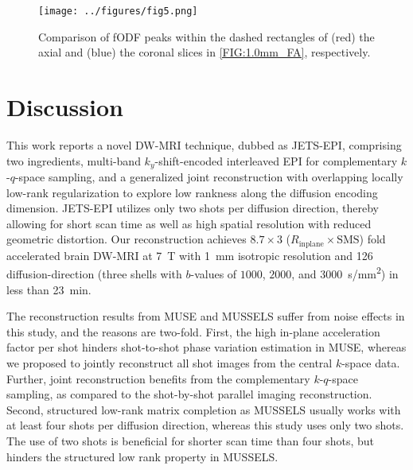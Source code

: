 \documentclass[preprint,12pt,authoryear,review]{elsarticle}
\begin{document}
	\begin{figure}
		\centering
		\texttt{[image: ../figures/fig5.png]}
		\caption{Comparison of fODF peaks within the dashed rectangles
		of (red) the axial and (blue) the coronal slices in \cref{FIG:1.0mm_FA}, respectively.}
		\label{FIG:1.0mm_fODF}
	\end{figure}

	\clearpage

	\section{Discussion}
	\label{SEC:Disc}

	This work reports a novel DW-MRI technique, dubbed as JETS-EPI,
	comprising two ingredients,
	multi-band $k_y$-shift-encoded interleaved EPI
	for complementary $k$-$q$-space sampling, and
	a generalized joint reconstruction
	with overlapping locally low-rank regularization
	to explore low rankness along the diffusion encoding dimension.
	JETS-EPI utilizes only two shots per diffusion direction,
        thereby allowing for short scan time %
        as well as high spatial resolution with reduced geometric distortion.
	Our reconstruction achieves $8.7 \times 3$ ($R_\mathrm{inplane} \times \mathrm{SMS}$)
	fold accelerated brain DW-MRI at \SI{7}{\tesla}
	with \SI{1}{mm} isotropic resolution
	and 126 diffusion-direction (three shells with
	$b$-values of $1000$, $2000$, and \SI{3000}{s/mm^2})
	in less than \SI{23}{min}.

	The reconstruction results from MUSE and MUSSELS
	suffer from noise effects in this study,
	and the reasons are two-fold.
	First, the high in-plane acceleration factor per shot
	hinders shot-to-shot phase variation estimation in MUSE,
        whereas we proposed to jointly reconstruct all shot images from the central $k$-space data.
        Further, joint reconstruction benefits from the complementary $k$-$q$-space sampling,
        as compared to the shot-by-shot parallel imaging reconstruction.
	Second, structured low-rank matrix completion as MUSSELS usually
	works with at least four shots per diffusion direction,
	whereas this study uses only two shots.
        The use of two shots is beneficial for shorter scan time than four shots,
        but hinders the structured low rank property in MUSSELS.
\end{document}
